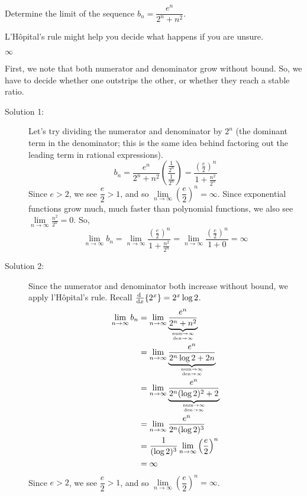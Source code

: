 \begin{Mquestion}
Determine the limit of the sequence $b_n=\dfrac{e^n}{2^n+n^2}$.
\end{Mquestion}
\begin{hint}
L'H\^{o}pital's rule might help you decide what happens if you are unsure.
\end{hint}
\begin{answer}
$\infty$
\end{answer}
\begin{solution}
First, we note that both numerator and denominator grow without bound. So, we have to decide whether one outstrips the other, or whether they reach a stable ratio.

\begin{description}
\item[Solution 1:] Let's try dividing the numerator and denominator by $2^n$ (the dominant term in the denominator; this is the same idea behind factoring out the leading term in rational expressions).
\[b_n = \frac{e^n}{2^n+n^2}\left(\frac{\frac{1}{2^n}}{\frac{1}{2^n}}\right) = \frac{\left(\frac{e}{2}\right)^n}{1+\frac{n^2}{2^n}}\]
Since $e>2$, we see $\dfrac{e}{2}>1$, and so $\lim\limits_{n \to \infty}\left(\dfrac{e}{2}\right)^n=\infty$. Since exponential functions grow much, much faster than polynomial functions, we also see $\lim\limits_{n \to \infty}\frac{n^2}{2^n}=0$. So,
\[\lim\limits_{n \to \infty}b_n = \lim\limits_{n \to \infty}  \frac{\left(\frac{e}{2}\right)^n}{1+\frac{n^2}{2^n}}  = \lim\limits_{n \to \infty}  \frac{\left(\frac{e}{2}\right)^n}{1+0} = \infty\]
\item[Solution 2:] Since the numerator and denominator both increase without bound, we apply l'H\^{o}pital's rule. Recall $\diff{}{x}\{2^x\} = 2^x\log 2$.
\begin{align*}
\lim_{n \to \infty}b_n&=\lim_{n \to \infty}\underbrace{\dfrac{e^n}{2^n+n^2}}_{\atp{\mathrm{num}\to \infty}{\mathrm{den}\to\infty}}\\
&=\lim_{n \to \infty}\underbrace{\frac{e^n}{2^n\log 2 + 2n}}_{\atp{\mathrm{num}\to \infty}{\mathrm{den}\to\infty}}\\
&=\lim_{n \to \infty} \underbrace{\frac{e^n}{2^n(\log 2)^2 + 2}}_{\atp{\mathrm{num}\to\infty}{\mathrm{den}\to\infty}}\\
&=\lim_{n \to \infty}\frac{e^n}{2^n(\log 2)^3}\\
&=\frac{1}{(\log 2)^3}\lim_{n \to \infty}{\left(\frac{e}{2}\right)^n}\\
&=\infty
\end{align*}
Since $e>2$, we see $\dfrac{e}{2}>1$, and so $\lim\limits_{n \to \infty}\left(\dfrac{e}{2}\right)^n=\infty$.
\end{description}
\end{solution}

